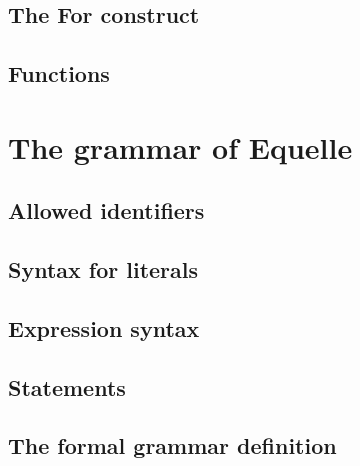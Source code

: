 \documentclass[11pt]{article}
\begin{document}
\subsection{The For construct}

\subsection{Functions}


\section{The grammar of Equelle}

\subsection{Allowed identifiers}

\subsection{Syntax for literals}

\subsection{Expression syntax}

\subsection{Statements}

\subsection{The formal grammar definition}



\end{document}
